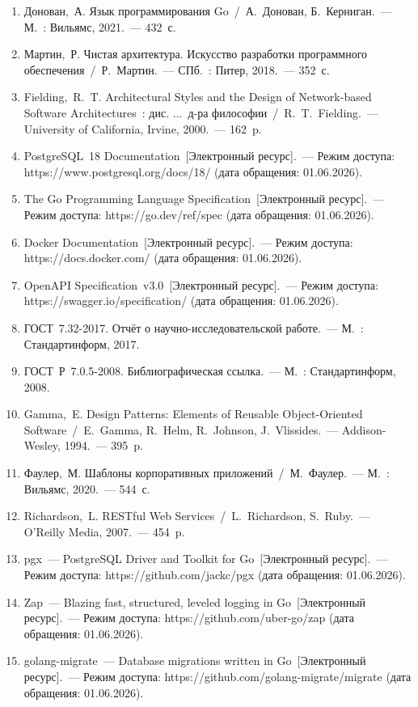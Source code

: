 \documentclass[a4paper,14pt]{extarticle}
\begin{document}
\begin{enumerate}[leftmargin=1.25cm, itemsep=2pt, label=\arabic*.]
  \item \label{src:donovan} Донован,~А. Язык программирования Go~/~А.~Донован, Б.~Керниган.~--- М.~: Вильямс, 2021.~--- 432~с.
  \item \label{src:martin} Мартин,~Р. Чистая архитектура. Искусство разработки программного обеспечения~/~Р.~Мартин.~--- СПб.~: Питер, 2018.~--- 352~с.
  \item \label{src:fielding} Fielding,~R.~T. Architectural Styles and the Design of Network-based Software Architectures~: дис. ...~д-ра философии~/~R.~T.~Fielding.~--- University of California, Irvine, 2000.~--- 162~p.
  \item \label{src:pgdocs} PostgreSQL~18 Documentation~[Электронный ресурс].~--- Режим доступа: https://www.postgresql.org/docs/18/ (дата обращения: 01.06.2026).
  \item \label{src:gospec} The Go Programming Language Specification~[Электронный ресурс].~--- Режим доступа: https://go.dev/ref/spec (дата обращения: 01.06.2026).
  \item \label{src:docker} Docker Documentation~[Электронный ресурс].~--- Режим доступа: https://docs.docker.com/ (дата обращения: 01.06.2026).
  \item \label{src:openapi} OpenAPI Specification~v3.0~[Электронный ресурс].~--- Режим доступа: https://swagger.io/specification/ (дата обращения: 01.06.2026).
  \item \label{src:gost732} ГОСТ~7.32-2017. Отчёт о научно-исследовательской работе.~--- М.~: Стандартинформ, 2017.
  \item \label{src:gost705} ГОСТ~Р~7.0.5-2008. Библиографическая ссылка.~--- М.~: Стандартинформ, 2008.
  \item \label{src:gamma} Gamma,~E. Design Patterns: Elements of Reusable Object-Oriented Software~/~E.~Gamma, R.~Helm, R.~Johnson, J.~Vlissides.~--- Addison-Wesley, 1994.~--- 395~p.
  \item \label{src:fowler} Фаулер,~М. Шаблоны корпоративных приложений~/~М.~Фаулер.~--- М.~: Вильямс, 2020.~--- 544~с.
  \item \label{src:richardson} Richardson,~L. RESTful Web Services~/~L.~Richardson, S.~Ruby.~--- O'Reilly Media, 2007.~--- 454~p.
  \item \label{src:pgx} pgx~--- PostgreSQL Driver and Toolkit for Go~[Электронный ресурс].~--- Режим доступа: https://github.com/jackc/pgx (дата обращения: 01.06.2026).
  \item \label{src:zap} Zap~--- Blazing fast, structured, leveled logging in Go~[Электронный ресурс].~--- Режим доступа: https://github.com/uber-go/zap (дата обращения: 01.06.2026).
  \item \label{src:migrate} golang-migrate~--- Database migrations written in Go~[Электронный ресурс].~--- Режим доступа: https://github.com/golang-migrate/migrate (дата обращения: 01.06.2026).
\end{enumerate}
\end{document}
